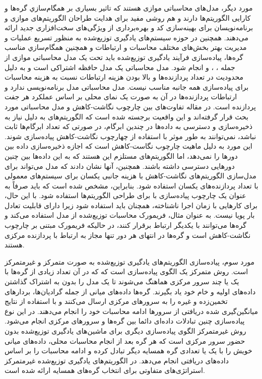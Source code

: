 مورد دیگر، مدل‌های محاسباتی موازی هستند که تاثیر بسیاری بر همگام‌سازي گره‌ها و کارایی الگوریتم‌ها دارند و هم روشی مفید برای هدایت طراحان الگوریتم‌های موازی و برنامه‌نویسان برای بهینه‌سازی کد و بهره‌برداری از ویژگی‌های سخت‌افزاری جدید ارائه می‌دهند. همچنین در حوزه سیستم‌های یادگیری توزیع‌شده به منظور تسریع عملیات و مدیریت بهتر بخش‌های مختلف محاسبات و ارتباطات و همچنین همگام‌سازي مناسب گره‌ها، پیاده‌سازی فرآیند یادگیری توزیع‌شده باید تحت یک مدل محاسباتی موازی از جمله  ، ،  و  انجام شود. مدل محاسباتی  یک مدل حافظه اشتراکی است و به دلیل محدودیت در تعداد پردازنده‌ها و بالا بودن هزینه ارتباطات نسبت به هزینه محاسبات برای پیاده‌سازی همه جانبه مناسب نیست. مدل محاسباتی  مدل برنامه‌نویسی ندارد و ارتباطات پردازنده‌ها در آن به صورت یک نمای محلی بر اساس عملکرد هر جفت پردازنده است. در مقاله \cite{BSP2012} تفاوت‌های بین چارچوب نگاشت-کاهش و مدل محاسباتی  مورد بحث قرار گرفته‌اند و این واقعیت برجسته شده است که الگوریتم‌های  به دلیل نیاز به ذخیره‌سازی و دسترسی به داده‌ها در چندین ابرگام، در صورتی که تعداد ابرگام‌ها ثابت نباشد، نمی‌توانند به طور موثر با استفاده از چهارچوب نگاشت-کاهش پیاده‌سازی شوند. این مورد به دلیل ماهیت چارچوب نگاست-کاهش است که اجازه ذخیره‌سازی داده بین دورها را نمی‌دهد، اما الگوریتم‌های  مستلزم این هستند که به این داده‌ها بین چنین دورهایی دسترسی داشته باشند. همچنین، آنها نشان دادند که مدل  می‌تواند برای مدل‌سازی الگوریتم‌های نگاشت-کاهش با هزینه جانبی یکسان برای سیستم‌های معمولی با تعداد پردازنده‌های یکسان استفاده شود. بنابراین، مشخص شده است که  باید صرفاً به عنوان یک چارچوب پیاده‌سازی با  برای طراحی الگوریتم‌ها استفاده شود. با این حال، برای کارهایی با زمان اجرا ناشناخته،  همچنان باید استفاده شود زیرا  دارای قابلیت تعادل بار پویا نیست. به عنوان مثال، فریمورک محاسبات توزیع‌شده از مدل  استفاده می‌کند و گره‌ها می‌توانند با یکدیگر ارتباط برقرار کنند، در حالیکه فریمورک  مبتنی بر چارچوب نگاشت-کاهش است و گره‌ها در انتهای هر دور تنها  مجاز به ارتباط با پردازنده مرکزی هستند. 

مورد سوم، پیاده‌سازی الگوریتم‌های یادگیری توزیع‌شده به صورت متمرکز و غیرمتمرکز است. روش متمرکز یک الگوی پیاده‌سازی است که که در آن تعداد زیادی از گره‌ها با یک یا چند سرور مرکزی هماهنگ می‌شوند تا یک مدل را بدون به اشتراک گذاشتن داده‌های اولیه و خام خود یاد بگیرند. گره‌ها داده‌های میانی از جمله گرادیان‌ها، بردارهای تخمین‌زده و غیره را به سرورهای مرکزی ارسال می‌کنند و با استفاده از نتایج میانگین‌گیری شده دریافتی از سرورها ادامه محاسبات خود را انجام می‌دهند. در این نوع پیاده‌سازی چنین تبادلات داده‌ای دائما بین گره‌ها و سرورهای مرکزی انجام می‌شود. روش غیرمتمرکز الگوی پیاده‌سازی دیگری برای ماشین‌های یادگیری توزیع‌شده  بدون حضور سرور مرکزی است که هر گره بعد از انجام محاسبات محلی، داده‌های میانی خویش را با یک یا تعدادی گره همسایه دیگر تبادل کرده و ادامه محاسبات را بر اساس داده‌های دریافتی انجام می‌دهد. در الگوریتم‌های یادگیری توزیع‌شده غیرمتمرکز  استراتژی‌های متفاوتی برای انتخاب گره‌های همسایه ارائه شده است. 

